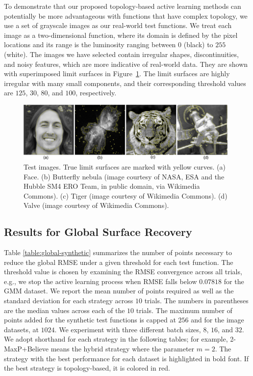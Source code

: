 To demonstrate that our proposed topology-based active learning methods can potentially be more advantageous with functions that have complex topology, we use a set of grayscale images as our real-world test functions.
%
We treat each image as a two-dimensional function, where its domain is defined by the pixel locations and its range is the luminosity ranging between $0$ (black) to $255$ (white).
%
The images we have selected contain irregular shapes, discontinuities, and noisy features, which are more indicative of real-world data.
%
They are shown with superimposed limit surfaces in Figure~\ref{fig:images}.
%
The limit surfaces are highly irregular with many small components, and their corresponding threshold values are $125$, $30$, $80$, and $100$, respectively.

\begin{figure}[b]
\centering
\includegraphics[width=0.98\textwidth]{figs/chap5/images}
\caption[Test images for batch adaptive sampling]{Test images. True limit surfaces are marked with yellow curves.
%
(a) Face.
%
(b) Butterfly nebula (image courtesy of NASA, ESA and the Hubble SM4 ERO Team,
in public domain, via Wikimedia Commons).
%
(c) Tiger (image courtesy of Wikimedia Commons).
%
(d) Valve (image courtesy of Wikimedia Commons).}
\label{fig:images}
\end{figure}

\subsection{Results for Global Surface Recovery}
\label{sec:global_results}
%
Table \ref{table:global-synthetic} summarizes the number of points necessary to reduce the global RMSE under a given threshold for each test function.
%
The threshold value is chosen by examining the RMSE convergence across all trials, e.g., we stop the active learning process when RMSE falls below $0.07818$ for the GMM dataset.
%
We report the mean number of points required as well as the standard deviation for each strategy across $10$ trials.
%
The numbers in parentheses are the median values across each of the $10$ trials.
%
The maximum number of points added for the synthetic test functions is capped at $256$ and for the image datasets, at $1024$.
%
We experiment with three different batch sizes, $8$, $16$, and $32$.
%
We adopt shorthand for each strategy in the following tables; for example, 2-MaxP+Believe means the hybrid strategy where the parameter $m = 2$.
%
The strategy with the best performance for each dataset is highlighted in bold font.
%
If the best strategy is topology-based, it is colored in red.

